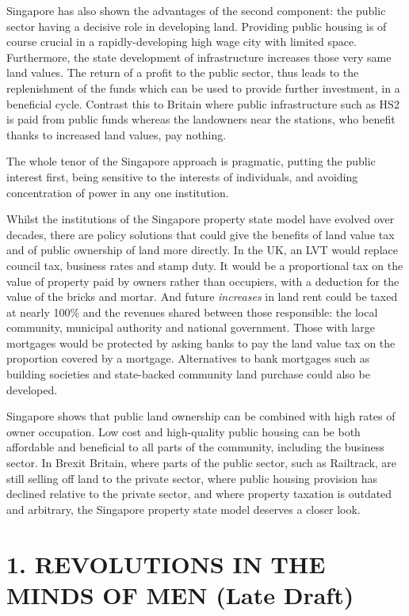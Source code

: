 \documentclass[]{tufte-handout}
\begin{document}
Singapore has also shown the advantages of the second component: the
public sector having a decisive role in developing land. Providing
public housing is of course crucial in a rapidly-developing high wage
city with limited space. Furthermore, the state development of
infrastructure increases those very same land values. The return of a
profit to the public sector, thus leads to the replenishment of the
funds which can be used to provide further investment, in a beneficial
cycle. Contrast this to Britain where public infrastructure such as HS2
is paid from public funds whereas the landowners near the stations, who
benefit thanks to increased land values, pay nothing.

The whole tenor of the Singapore approach is pragmatic, putting the
public interest first, being sensitive to the interests of individuals,
and avoiding concentration of power in any one institution.

Whilst the institutions of the Singapore property state model have
evolved over decades, there are policy solutions that could give the
benefits of land value tax and of public ownership of land more
directly. In the UK, an LVT would replace council tax, business rates
and stamp duty. It would be a proportional tax on the value of property
paid by owners rather than occupiers, with a deduction for the value of
the bricks and mortar. And future \emph{increases} in land rent could be
taxed at nearly 100\% and the revenues shared between those responsible:
the local community, municipal authority and national government. Those
with large mortgages would be protected by asking banks to pay the land
value tax on the proportion covered by a mortgage. Alternatives to bank
mortgages such as building societies and state-backed community land
purchase could also be developed.

Singapore shows that public land ownership can be combined with high
rates of owner occupation. Low cost and high-quality public housing can
be both affordable and beneficial to all parts of the community,
including the business sector. In Brexit Britain, where parts of the
public sector, such as Railtrack, are still selling off land to the
private sector, where public housing provision has declined relative to
the private sector, and where property taxation is outdated and
arbitrary, the Singapore property state model deserves a closer look.

\newpage

\hypertarget{revolutions-in-the-minds-of-men-late-draft}{%
\section{1. REVOLUTIONS IN THE MINDS OF MEN (Late
Draft)}\label{revolutions-in-the-minds-of-men-late-draft}}
\end{document}
